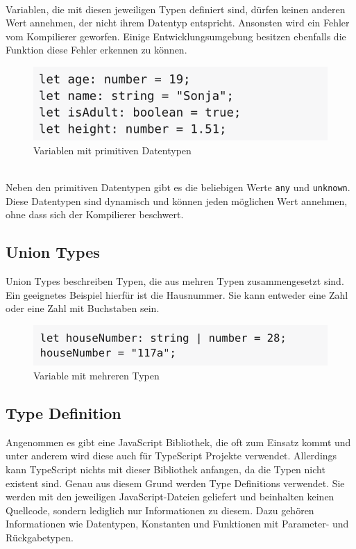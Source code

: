 \mbox{}\\
Variablen, die mit diesen jeweiligen Typen definiert sind, dürfen keinen anderen Wert annehmen, der nicht ihrem Datentyp entspricht. Ansonsten wird ein Fehler vom Kompilierer geworfen. Einige Entwicklungsumgebung besitzen ebenfalls die Funktion diese Fehler erkennen zu können.

\begin{figure}[H]
	\begin{center}
		\includegraphics[scale=.7]{images/typescript-primitve-types.png}
	\end{center}
		\caption{Variablen mit primitiven Datentypen}
\end{figure}

\mbox{}\\
Neben den primitiven Datentypen gibt es die beliebigen Werte \texttt{any} und \texttt{unknown}. Diese Datentypen sind dynamisch und können jeden möglichen Wert annehmen, ohne dass sich der Kompilierer beschwert. 

\subsection{Union Types}
Union Types beschreiben Typen, die aus mehren Typen zusammengesetzt sind. Ein geeignetes Beispiel hierfür ist die Hausnummer. Sie kann entweder eine Zahl oder eine Zahl mit Buchstaben sein.

\begin{figure}[H]
	\begin{center}
		\includegraphics[scale=.7]{images/typescript-union-types.png}
	\end{center}
		\caption{Variable mit mehreren Typen}
\end{figure}

\subsection{Type Definition}
Angenommen es gibt eine JavaScript Bibliothek, die oft zum Einsatz kommt und unter anderem wird diese auch für TypeScript Projekte verwendet. Allerdings kann TypeScript nichts mit dieser Bibliothek anfangen, da die Typen nicht existent sind. Genau aus diesem Grund werden Type Definitions verwendet. Sie werden mit den jeweiligen JavaScript-Dateien geliefert und beinhalten keinen Quellcode, sondern lediglich nur Informationen zu diesem. Dazu gehören Informationen wie Datentypen, Konstanten und Funktionen mit Parameter- und Rückgabetypen.

